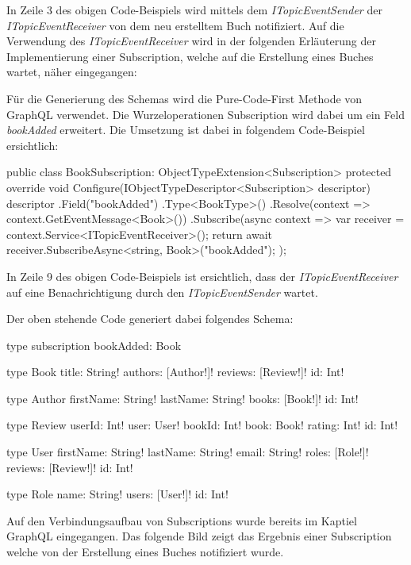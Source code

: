 In Zeile 3 des obigen Code-Beispiels wird mittels dem \textit{ITopicEventSender} der \textit{ITopicEventReceiver} von dem neu erstelltem Buch notifiziert.
Auf die Verwendung des \textit{ITopicEventReceiver} wird in der folgenden Erläuterung der Implementierung einer Subscription, welche auf die Erstellung eines Buches wartet, näher eingegangen:

Für die Generierung des Schemas wird die Pure-Code-First Methode von GraphQL verwendet.
Die Wurzeloperationen Subscription wird dabei um ein Feld \textit{bookAdded} erweitert.
Die Umsetzung ist dabei in folgendem Code-Beispiel ersichtlich:

\begin{JsCode}
public class BookSubscription: ObjectTypeExtension<Subscription> {
    protected override void Configure(IObjectTypeDescriptor<Subscription> descriptor) {
        descriptor
        .Field("bookAdded")
        .Type<BookType>()
        .Resolve(context => context.GetEventMessage<Book>())
        .Subscribe(async context => {
            var receiver = context.Service<ITopicEventReceiver>();
            return await receiver.SubscribeAsync<string, Book>("bookAdded");
        });
    }
}    
\end{JsCode}
In Zeile 9 des obigen Code-Beispiels ist ersichtlich, dass der \textit{ITopicEventReceiver} auf eine Benachrichtigung durch den \textit{ITopicEventSender} wartet.

Der oben stehende Code generiert dabei folgendes Schema:
\begin{JsCode}
type subscription{
    bookAdded: Book
}

type Book {
  title: String!
  authors: [Author!]!
  reviews: [Review!]!
  id: Int!
}

type Author {
  firstName: String!
  lastName: String!
  books: [Book!]!
  id: Int!
}

type Review {
  userId: Int!
  user: User!
  bookId: Int!
  book: Book!
  rating: Int!
  id: Int!
}

type User {
  firstName: String!
  lastName: String!
  email: String!
  roles: [Role!]!
  reviews: [Review!]!
  id: Int!
}

type Role {
  name: String!
  users: [User!]!
  id: Int!
}
\end{JsCode} 

Auf den Verbindungsaufbau von Subscriptions wurde bereits im Kaptiel GraphQL eingegangen.
Das folgende Bild zeigt das Ergebnis einer Subscription welche von der Erstellung eines Buches notifiziert wurde.

